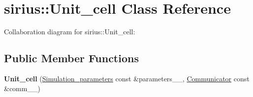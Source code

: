 \hypertarget{classsirius_1_1_unit__cell}{}\section{sirius\+:\+:Unit\+\_\+cell Class Reference}
\label{classsirius_1_1_unit__cell}


Collaboration diagram for sirius\+:\+:Unit\+\_\+cell\+:
\subsection*{Public Member Functions}
\begin{DoxyCompactItemize}
\item 
\hypertarget{classsirius_1_1_unit__cell_ab4b233c421f332b0b21a6186eeae6391}{}{\bfseries Unit\+\_\+cell} (\hyperlink{classsirius_1_1_simulation__parameters}{Simulation\+\_\+parameters} const \&parameters\+\_\+\+\_\+, \hyperlink{classsddk_1_1_communicator}{Communicator} const \&comm\+\_\+\+\_\+)\label{classsirius_1_1_unit__cell_ab4b233c421f332b0b21a6186eeae6391}


\end{DoxyCompactItemize}
